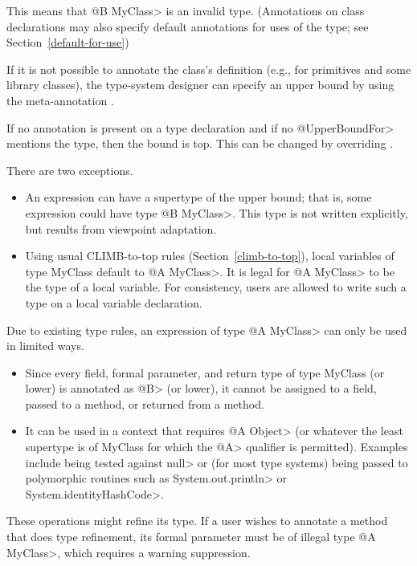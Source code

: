 This means that \<@B MyClass> is an invalid type.  (Annotations on class declarations may also specify
default annotations for uses of the type; see Section~\ref{default-for-use})

If it is not possible to annotate the class's definition (e.g., for
primitives and some library classes),
the type-system designer can specify an upper bound by using the meta-annotation
.

If no annotation is present on a type declaration and if no \<@UpperBoundFor> mentions the type, then
the bound is top. This can be changed by overriding
.

There are two exceptions.
\begin{itemize}
  \item
  An expression can have a supertype of the upper bound; that is, some expression could
  have type \<@B MyClass>.  This type is not written explicitly, but results from viewpoint adaptation.
  \item
  Using usual CLIMB-to-top rules (Section~\ref{climb-to-top}),
  local variables of type MyClass default to \<@A MyClass>.
  It is legal for \<@A MyClass> to be the type of a local variable.
  For consistency, users are allowed to write such a type on a local variable declaration.
\end{itemize}

Due to existing type rules, an expression of type \<@A MyClass> can only be used in limited ways.
\begin{itemize}
  \item
  Since every field, formal parameter, and return type of type MyClass (or lower) is annotated as
  \<@B> (or lower), it cannot be assigned to a field, passed to a method, or returned from a method.
  \item
  It can be used in a context that requires \<@A Object> (or whatever the least supertype is of MyClass
  for which the \<@A> qualifier is permitted).  Examples include being tested against \<null> or
  (for most type systems) being passed to polymorphic routines such as \<System.out.println> or \<System.identityHashCode>.
\end{itemize}

These operations might refine its type.  If a user wishes to annotate a method that does type refinement,
its formal parameter must be of illegal type \<@A MyClass>, which requires a warning suppression.


